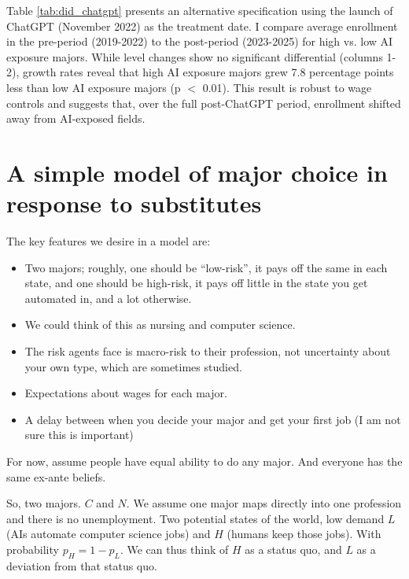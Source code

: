 \documentclass[12pt]{article}
\begin{document}


Table \ref{tab:did_chatgpt} presents an alternative specification using the launch of ChatGPT (November 2022) as the treatment date. I compare average enrollment in the pre-period (2019-2022) to the post-period (2023-2025) for high vs. low AI exposure majors. While level changes show no significant differential (columns 1-2), growth rates reveal that high AI exposure majors grew 7.8 percentage points less than low AI exposure majors (p $<$ 0.01). This result is robust to wage controls and suggests that, over the full post-ChatGPT period, enrollment shifted away from AI-exposed fields.





\section{A simple model of major choice in response to substitutes}
The key features we desire in a model are:
\begin{itemize}
\item Two majors; roughly, one should be ``low-risk'', it pays off the same in each state, and one should be high-risk, it pays off little in the state you get automated in, and a lot otherwise.
\item We could think of this as nursing and computer science. 
\item The risk agents face is macro-risk to their profession, not uncertainty about your own type, which are sometimes studied. 
\item Expectations about wages for each major.
\item A delay between when you decide your major and get your first job (I am not sure this is important)
\end{itemize}

For now, assume people have equal ability to do any major. And everyone has the same ex-ante beliefs.


So, two majors. $C$ and $N$. We assume one major maps directly into one profession and there is no unemployment. Two potential states of the world, low demand $L$ (AIs automate computer science jobs) and $H$ (humans keep those jobs). With probability $p_H = 1-p_L$.  We can thus think of $H$ as a status quo, and $L$ as a deviation from that status quo. 
\end{document}
